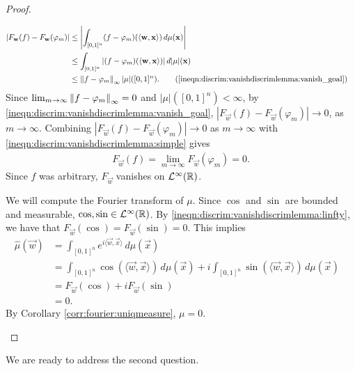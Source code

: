 \begin{proof}
\begin{step}
\begin{subequations}
\begin{align*}
    \left | F_{\vec{w}}(f) - F_{\vec{w}}(\varphi_m) \right | &\leq \left | \int_{[0,1]^n} (f - \varphi_m) ( \langle \vec{w}, \vec{x} \rangle) \, d \mu  (\vec{x}) \right | & \\
    & \leq \int_{[0,1]^n} |  (f - \varphi_m) ( \langle \vec{w}, \vec{x} \rangle) | \, d |\mu| ( \vec{x}) &\\
    & \leq \norm{f - \varphi_m}_\infty |\mu| ([0,1]^n).
    \tag{\ref{ineqn:discrim:vanishdiscrimlemma:vanish_goal}} 
\end{align*}
\end{subequations}
Since $\lim_{m \to \infty}  \left\lVert f - \varphi_m\right\rVert_\infty = 0$ and $ |\mu| ([0,1]^n) < \infty$, by \ref{ineqn:discrim:vanishdiscrimlemma:vanish_goal}, $\left | F_{\vec{w}}(f) - F_{\vec{w}}(\varphi_m) \right | \to 0$, as $m \to \infty$.
Combining   $\left | F_{\vec{w}}(f) - F_{\vec{w}}(\varphi_m) \right | \to 0$ as $m \to \infty$ with  \ref{ineqn:discrim:vanishdiscrimlemma:simple} gives
\begin{align}
   \label{ineqn:discrim:vanishdiscrimlemma:linfty}
   F_{\vec{w}}(f) = \lim_{m \to \infty} F_{\vec{w}}(\varphi_m) = 0.
\end{align}
Since $f$ was arbitrary, $F_\vec{w}$ vanishes on ${\mathcal {L}^\infty}({\mathbb R})$.
\end{step}
\begin{step}
We will compute the Fourier transform of $\mu$.
Since $\cos$ and $\sin$ are bounded and measurable, $\cos, \sin \in {\mathcal {L}^\infty}({\mathbb R})$. By \ref{ineqn:discrim:vanishdiscrimlemma:linfty}, we have that $F_\vec{w}(\cos) = F_\vec{w}(\sin) = 0$. This implies  
\begin{align*}
    \widehat{\mu}(\vec{w}) &= \int_{[0,1]^n} e^{i \langle \vec{w}, \vec{x} \rangle } \, d\mu(\vec{x}) & \\
                           &=  \int_{[0,1]^n} \cos (\langle \vec{w}, \vec{x} \rangle) \, d\mu(\vec{x}) + i \int_{[0,1]^n} \sin (\langle \vec{w}, \vec{x} \rangle) \, d\mu(\vec{x})  &\\
                           &= F_\vec{w}(\cos) + i F_\vec{w}(\sin) &\\
                           &= 0.
\end{align*}
By Corollary \ref{corr:fourier:uniqmeasure}, $\mu = 0$.
\end{step}
\end{proof}


We are ready to address the second question.

